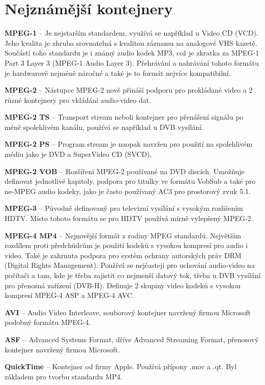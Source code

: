 \section{Nejznámější kontejnery}
\bitem
\item\textbf{MPEG-1} -- Je nejstarším standardem, využívá se například u Video CD (VCD). Jeho kvalita je zhruba srovnatelná s kvalitou záznamu na analogové VHS kazetě. Součástí toho standardu je i známý audio kodek MP3, což je zkratka za MPEG-1 Part 3 Layer 3 (MPEG-1 Audio Layer 3). Přehrávání a nahrávání tohoto formátu je hardwarově nejméně náročné a také je to formát nejvíce kompatibilní.
\item\textbf{MPEG-2} -- Nástupce MPEG-2 nově přináší podporu pro prokládané video a 2 různé kontejnery pro vkládání audio-video dat.
\item\textbf{MPEG-2 TS} -- Transport stream neboli kontejner pro přenášení signálu po méně spolehlivém kanálu, používá se například u DVB vysílání.
\item\textbf{MPEG-2 PS} -- Program stream je naopak navržen pro použití na spolehlivém médiu jako je DVD a SuperVideo CD (SVCD).
\item\textbf{MPEG-2 VOB} -- Rozšíření MPEG-2 používané na DVD discích. Umožňuje definovat jednotlivé kapitoly, podpora pro titulky ve formátu VobSub a také pro ne-MPEG audio kodeky, jako je často používaný AC3 pro prostorový zvuk 5.1.
\item\textbf{MPEG-3} -- Původně definovaný pro televizní vysílání s vysokým rozlišením HDTV. Místo tohoto formátu se pro HDTV používá mírně vylepšený MPEG-2.
\item\textbf{MPEG-4 MP4} -- Nejnovější formát z rodiny MPEG standardů. Největším rozdílem proti předchůdcům je použití kodeků s vysokou kompresí pro audio i video. Také je zahrnuta podpora pro systém ochrany autorských práv DRM (Digital Rights Management). Používá se nejčasteji pro uchování audio-video na počítači a tam, kde je třeba zajistit co nejmenší datový tok, třeba u DVB vysílání pro přenosná zařízení (DVB-H). Definuje 2 skupiny video kodeků s vysokou kompresí MPEG-4 ASP a MPEG-4 AVC.
\item\textbf{AVI} -- Audio Video Interleave, souborový kontejner navržený firmou Microsoft podobný formátu MPEG-4.
\item\textbf{ASF} -- Advanced Systems Format, dříve Advanced Streaming Format, přenosový kontejner navržený firmou Microsoft.
\item\textbf{QuickTime} -- Kontejner od firmy Apple. Používá přípony .mov a .qt. Byl základem pro tvorbu standardu MP4.
